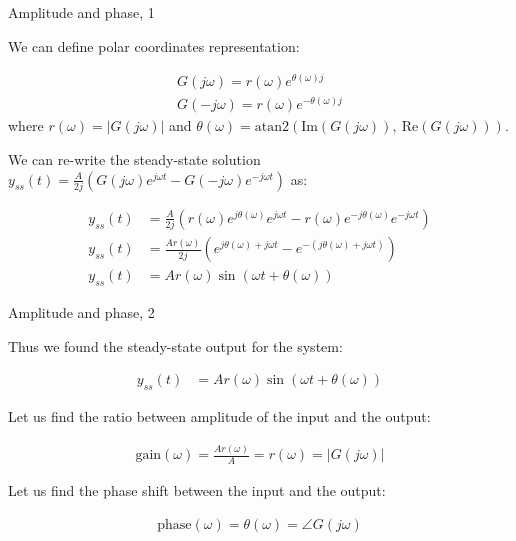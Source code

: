 \documentclass{beamer}
\begin{document}
\begin{frame}{Amplitude and phase, 1}
	\begin{flushleft}
		
		We can define polar coordinates representation:
		
		\begin{align}
			G(j\omega) = r(\omega) e^{\theta(\omega) j} 
			\\
			G(-j\omega) = r(\omega) e^{-\theta(\omega) j}
		\end{align}
		where $r(\omega) = |G(j\omega)|$ and 
		$\theta(\omega) = \text{atan2}( \text{Im}(G(j\omega)), \ \text{Re}(G(j\omega))  )$.
		
		\bigskip
		
		We can re-write the steady-state solution $y_{ss}(t) = 
		\frac{A}{2j}
		\left(
		G(j\omega)e^{ j\omega t} - G(-j\omega) e^{- j\omega t}
		\right)$ as:
		
		\begin{align}
			y_{ss}(t) &= 
			\frac{A}{2j}
			\left(
			r(\omega) e^{j \theta(\omega) }e^{ j\omega t} - r(\omega) e^{-j\theta(\omega) } e^{- j\omega t}
			\right)
			\\
			y_{ss}(t) &= 
			\frac{A r(\omega)}{2j}
			\left(
			 e^{j \theta(\omega) + j\omega t} - e^{-(j \theta(\omega) + j\omega t)}
			\right)
			\\
			y_{ss}(t) &= 
			A r(\omega) \sin (\omega t + \theta(\omega))
		\end{align}
		
		
	\end{flushleft}
\end{frame}




\begin{frame}{Amplitude and phase, 2}
	\begin{flushleft}
		
		Thus we found the steady-state output for the system:
		
		\begin{align}
			y_{ss}(t) &= 
			A r(\omega) \sin (\omega t + \theta(\omega))
		\end{align}
		
		Let us find the ratio between amplitude of the input and the output:
		
		\begin{align}
			\text{gain}(\omega)
			=
			\frac{A r(\omega)}{A} = r(\omega) = |G(j\omega)|
		\end{align}
		
		Let us find the phase shift between the input and the output:
		
		\begin{align}
			\text{phase}(\omega)
			=
			\theta(\omega) 
			=
			\angle G(j\omega)
		\end{align}
		
	\end{flushleft}
\end{frame}
\end{document}
